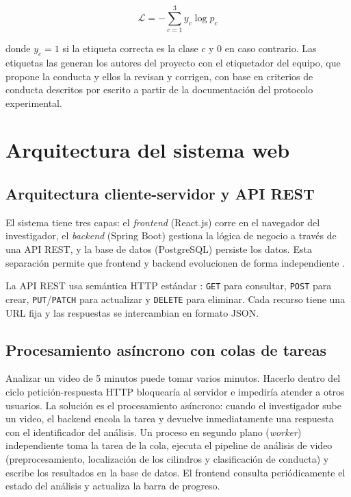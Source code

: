 \begin{equation}
    \mathcal{L} = -\sum_{c=1}^{3} y_c \log p_c
    \label{eq:crossentropy}
\end{equation}

donde $y_c = 1$ si la etiqueta correcta es la clase $c$ y 0 en caso contrario. Las
etiquetas las generan los autores del proyecto con el etiquetador del equipo, que
propone la conducta y ellos la revisan y corrigen, con base en criterios de
conducta descritos por escrito a partir de la documentación del protocolo
experimental.

\section{Arquitectura del sistema web}

\subsection{Arquitectura cliente-servidor y API REST}

El sistema tiene tres capas: el \textit{frontend} (React.js) corre en el navegador del
investigador, el \textit{backend} (Spring Boot) gestiona la lógica de negocio a través de una API
REST, y la base de datos (PostgreSQL) persiste los datos. Esta separación permite que
frontend y backend evolucionen de forma independiente \cite{fielding2000}.

La API REST usa semántica HTTP estándar \cite{rfc9110}: \texttt{GET} para consultar,
\texttt{POST} para crear, \texttt{PUT}/\texttt{PATCH} para actualizar y
\texttt{DELETE} para eliminar. Cada recurso tiene una URL fija y las respuestas
se intercambian en formato JSON.

\subsection{Procesamiento asíncrono con colas de tareas}

Analizar un video de 5 minutos puede tomar varios minutos. Hacerlo dentro del ciclo
petición-respuesta HTTP bloquearía al servidor e impediría atender a otros usuarios.
La solución es el procesamiento asíncrono: cuando el investigador sube un video, el
backend encola la tarea y devuelve inmediatamente una respuesta con el identificador
del análisis. Un proceso en segundo plano (\textit{worker}) independiente toma la tarea de la cola, ejecuta el
pipeline de análisis de video (preprocesamiento, localización de los cilindros y
clasificación de conducta) y escribe los resultados en la base de datos. El frontend consulta
periódicamente el estado del análisis y actualiza la barra de progreso.

